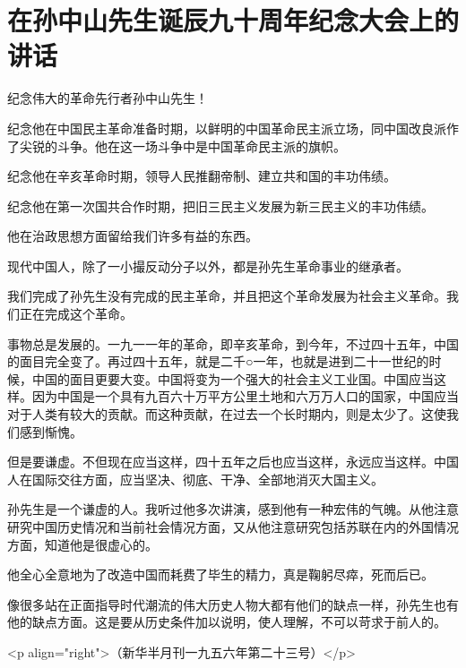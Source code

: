 \section[在孙中山先生诞辰九十周年纪念大会上的讲话（一九五六年十一月十二日）]{在孙中山先生诞辰九十周年纪念大会上的讲话}


纪念伟大的革命先行者孙中山先生！

纪念他在中国民主革命准备时期，以鲜明的中国革命民主派立场，同中国改良派作了尖锐的斗争。他在这一场斗争中是中国革命民主派的旗帜。

纪念他在辛亥革命时期，领导人民推翻帝制、建立共和国的丰功伟绩。

纪念他在第一次国共合作时期，把旧三民主义发展为新三民主义的丰功伟绩。

他在治政思想方面留给我们许多有益的东西。

现代中国人，除了一小撮反动分子以外，都是孙先生革命事业的继承者。

我们完成了孙先生没有完成的民主革命，并且把这个革命发展为社会主义革命。我们正在完成这个革命。

事物总是发展的。一九一一年的革命，即辛亥革命，到今年，不过四十五年，中国的面目完全变了。再过四十五年，就是二千○一年，也就是进到二十一世纪的时候，中国的面目更要大变。中国将变为一个强大的社会主义工业国。中国应当这样。因为中国是一个具有九百六十万平方公里土地和六万万人口的国家，中国应当对于人类有较大的贡献。而这种贡献，在过去一个长时期内，则是太少了。这使我们感到惭愧。

但是要谦虚。不但现在应当这样，四十五年之后也应当这样，永远应当这样。中国人在国际交往方面，应当坚决、彻底、干净、全部地消灭大国主义。

孙先生是一个谦虚的人。我听过他多次讲演，感到他有一种宏伟的气魄。从他注意研究中国历史情况和当前社会情况方面，又从他注意研究包括苏联在内的外国情况方面，知道他是很虚心的。

他全心全意地为了改造中国而耗费了毕生的精力，真是鞠躬尽瘁，死而后已。

像很多站在正面指导时代潮流的伟大历史人物大都有他们的缺点一样，孙先生也有他的缺点方面。这是要从历史条件加以说明，使人理解，不可以苛求于前人的。

<p align="right">（新华半月刊一九五六年第二十三号）</p>



